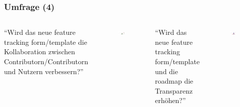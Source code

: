 \documentclass{beamer}
\begin{document}
\begin{frame}
\frametitle{Umfrage (4)}
\begin{columns}
  ``Wird das neue feature tracking form/template die Kollaboration zwischen Contributorn/Contributorn und Nutzern verbessern?''
   \begin{figure}[h!]
    \centering
    \includegraphics[scale=0.25,keepaspectratio=true]{./amarok3bchalo3bc.png}
   \end{figure}
 ``Wird das neue feature tracking form/template und die roadmap die Transparenz erh\"ohen?''\newline
   \begin{figure}[h!]
    \centering
    \includegraphics[scale=0.25,keepaspectratio=true]{./amarok3dhalo3d.png}
   \end{figure}
\end{columns}
\end{frame}
\end{document}
